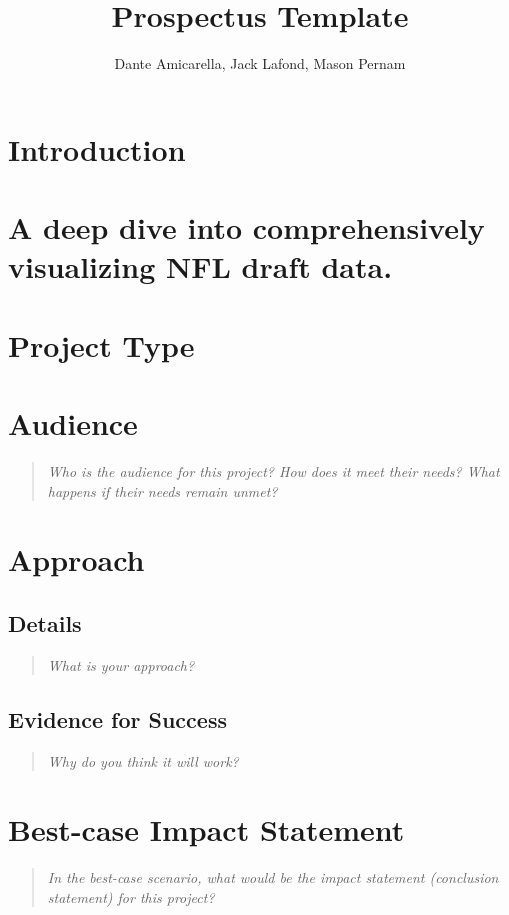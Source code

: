 \documentclass{proc}
\begin{document}
\title{Prospectus Template}

\author{Dante Amicarella, Jack Lafond, Mason Pernam}

\maketitle

\section{Introduction}

\section{A deep dive into comprehensively visualizing NFL draft data.}

\section{Project Type}

\section{Audience} 
\begin{quote}
\textit{Who is the audience for this project? 
How does it meet their needs? 
What happens if their needs remain unmet?}
\end{quote}

\section{Approach}
\subsection{Details}
\begin{quote}
\textit{What is your approach?}
\end{quote}

\subsection{Evidence for Success}
\begin{quote}
\textit{Why do you think it will work?} 
\end{quote}


\section{Best-case Impact Statement}
\begin{quote}
\textit{In the best-case scenario, what would be the impact statement (conclusion statement) for this project? \cite{wijk2005value, pike2009science}}
\end{quote}
\end{document}
